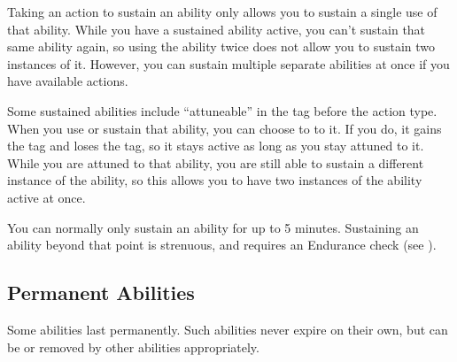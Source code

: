     Taking an action to sustain an ability only allows you to sustain a single use of that ability.
    While you have a sustained ability active, you can't sustain that same ability again, so using the ability twice does not allow you to sustain two instances of it.
    However, you can sustain multiple separate abilities at once if you have available actions.

    Some sustained abilities include ``attuneable'' in the tag before the action type.
    When you use or sustain that ability, you can choose to  to it.
    If you do, it gains the  tag and loses the  tag, so it stays active as long as you stay attuned to it.
    While you are attuned to that ability, you are still able to sustain a different instance of the ability, so this allows you to have two instances of the ability active at once.

    You can normally only sustain an ability for up to 5 minutes.
    Sustaining an ability beyond that point is strenuous, and requires an Endurance check (see ).

  \subsection{Permanent Abilities}
    Some abilities last permanently.
    Such abilities never expire on their own, but can be  or removed by other abilities appropriately.
